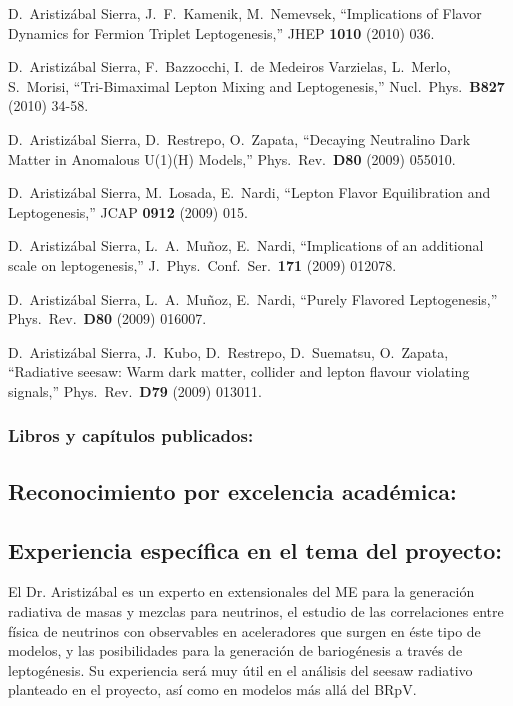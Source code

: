   D.~Aristizábal Sierra, J.~F.~Kamenik, M.~Nemevsek,
  ``Implications of Flavor Dynamics for Fermion Triplet Leptogenesis,''
  JHEP {\bf 1010 } (2010)  036.

  D.~Aristizábal Sierra, F.~Bazzocchi, I.~de Medeiros Varzielas, L.~Merlo, S.~Morisi,
  ``Tri-Bimaximal Lepton Mixing and Leptogenesis,''
  Nucl.\ Phys.\  {\bf B827 } (2010)  34-58.

  D.~Aristizábal Sierra, D.~Restrepo, O.~Zapata,
  ``Decaying Neutralino Dark Matter in Anomalous U(1)(H) Models,''
  Phys.\ Rev.\  {\bf D80 } (2009)  055010.

  D.~Aristizábal Sierra, M.~Losada, E.~Nardi,
  ``Lepton Flavor Equilibration and Leptogenesis,''
  JCAP {\bf 0912 } (2009)  015.

  D.~Aristizábal Sierra, L.~A.~Muñoz, E.~Nardi,
  ``Implications of an additional scale on leptogenesis,''
  J.\ Phys.\ Conf.\ Ser.\  {\bf 171 } (2009)  012078.

  D.~Aristizábal Sierra, L.~A.~Muñoz, E.~Nardi,
  ``Purely Flavored Leptogenesis,''
  Phys.\ Rev.\  {\bf D80 } (2009)  016007.

  D.~Aristizábal Sierra, J.~Kubo, D.~Restrepo, D.~Suematsu, O.~Zapata,
  ``Radiative seesaw: Warm dark matter, collider and lepton flavour violating signals,''
  Phys.\ Rev.\  {\bf D79 } (2009)  013011.
\subsubsection{Libros y capítulos publicados:}
\subsection{Reconocimiento por excelencia académica:}
\subsection{Experiencia específica en el tema del proyecto:}
El Dr. Aristizábal es un experto en extensionales del ME para la
generación radiativa de masas y mezclas para neutrinos, el estudio de
las correlaciones entre física de neutrinos con observables en
aceleradores que surgen en éste tipo de modelos, y las posibilidades
para la generación de bariogénesis a través de leptogénesis. Su
experiencia será muy útil en el análisis del seesaw radiativo
planteado en el proyecto, así como en modelos más allá del BRpV.
